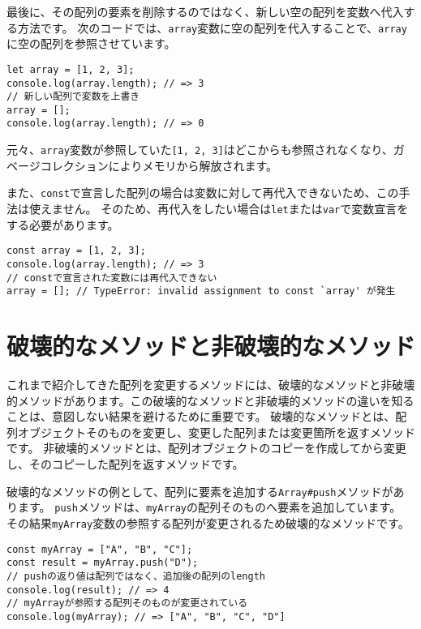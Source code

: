 最後に、その配列の要素を削除するのではなく、新しい空の配列を変数へ代入する方法です。
次のコードでは、\texttt{array}変数に空の配列を代入することで、\texttt{array}に空の配列を参照させています。

\begin{lstlisting}
let array = [1, 2, 3];
console.log(array.length); // => 3
// 新しい配列で変数を上書き
array = [];
console.log(array.length); // => 0
\end{lstlisting}

元々、\texttt{array}変数が参照していた\texttt{[1, 2, 3]}はどこからも参照されなくなり、ガベージコレクションによりメモリから解放されます。

また、\texttt{const}で宣言した配列の場合は変数に対して再代入できないため、この手法は使えません。
そのため、再代入をしたい場合は\texttt{let}または\texttt{var}で変数宣言をする必要があります。

\begin{lstlisting}
const array = [1, 2, 3];
console.log(array.length); // => 3
// constで宣言された変数には再代入できない
array = []; // TypeError: invalid assignment to const `array' が発生
\end{lstlisting}

\hypertarget{mutable-immutable}{%
\section{破壊的なメソッドと非破壊的なメソッド}\label{mutable-immutable}}

これまで紹介してきた配列を変更するメソッドには、破壊的なメソッドと非破壊的メソッドがあります。この破壊的なメソッドと非破壊的メソッドの違いを知ることは、意図しない結果を避けるために重要です。
破壊的なメソッドとは、配列オブジェクトそのものを変更し、変更した配列または変更箇所を返すメソッドです。
非破壊的メソッドとは、配列オブジェクトのコピーを作成してから変更し、そのコピーした配列を返すメソッドです。

破壊的なメソッドの例として、配列に要素を追加する\texttt{Array\#push}メソッドがあります。
\texttt{push}メソッドは、\texttt{myArray}の配列そのものへ要素を追加しています。
その結果\texttt{myArray}変数の参照する配列が変更されるため破壊的なメソッドです。

\begin{lstlisting}
const myArray = ["A", "B", "C"];
const result = myArray.push("D"); 
// pushの返り値は配列ではなく、追加後の配列のlength
console.log(result); // => 4
// myArrayが参照する配列そのものが変更されている
console.log(myArray); // => ["A", "B", "C", "D"]
\end{lstlisting}


